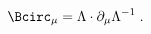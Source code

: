 \begin{equation}
\label{e5:49}
\Bcirc_{\mu} = \Lambda \cdot \partial_{\mu} \Lambda^{-1} \; .
\end{equation}

